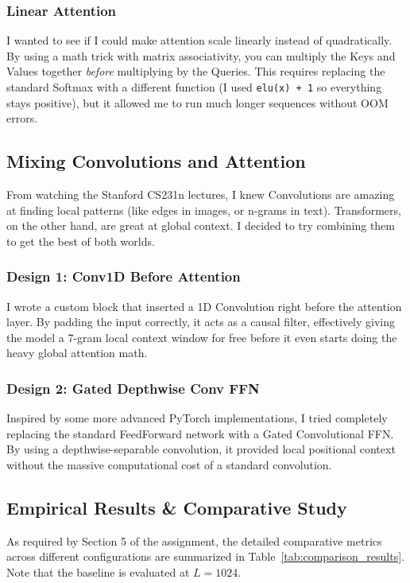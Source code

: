 \documentclass[11pt,a4paper]{article}
\begin{document}
\subsubsection{Linear Attention}
I wanted to see if I could make attention scale linearly instead of quadratically. By using a math trick with matrix associativity, you can multiply the Keys and Values together \emph{before} multiplying by the Queries. This requires replacing the standard Softmax with a different function (I used \texttt{elu(x) + 1} so everything stays positive), but it allowed me to run much longer sequences without OOM errors.

\subsection{Mixing Convolutions and Attention}

From watching the Stanford CS231n lectures, I knew Convolutions are amazing at finding local patterns (like edges in images, or n-grams in text). Transformers, on the other hand, are great at global context. I decided to try combining them to get the best of both worlds.

\subsubsection{Design 1: Conv1D Before Attention}
I wrote a custom block that inserted a 1D Convolution right before the attention layer. By padding the input correctly, it acts as a causal filter, effectively giving the model a 7-gram local context window for free before it even starts doing the heavy global attention math.

\subsubsection{Design 2: Gated Depthwise Conv FFN}
Inspired by some more advanced PyTorch implementations, I tried completely replacing the standard FeedForward network with a Gated Convolutional FFN. By using a depthwise-separable convolution, it provided local positional context without the massive computational cost of a standard convolution.

\subsection{Empirical Results \& Comparative Study}
As required by Section 5 of the assignment, the detailed comparative metrics across different configurations are summarized in Table~\ref{tab:comparison_results}. Note that the baseline is evaluated at $L=1024$.
\end{document}

